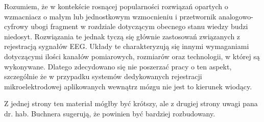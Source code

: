 
\begin{frame}[t]
    \begin{block}{\dk}
    \end{block}

    Rozumiem, że w kontekście rosnącej popularności rozwiązań opartych o wzmacniacz o małym lub jednostkowym wzmocnieniu i przetwornik analogowo-cyfrowy ubogi fragment w rozdziale dotyczącym obecnego stanu wiedzy budzi niedosyt.
    Rozwiązania te jednak tyczą  się głównie zastosowań związanych z rejestracją sygnałów EEG. Układy  te charakteryzują się innymi wymaganiami dotyczącymi ilości kanałów pomiarowych, rozmiarów oraz technologii, w której są wykonywane.
    Dlatego zdecydowano się nie poszerzać pracy o ten aspekt, szczególnie że w przypadku systemów dedykowanych rejestracji mikroelektrodowej aplikowanych wewnątrz mózgu nie jest to kierunek wiodący.

\end{frame}

\begin{frame}[t]
    \begin{block}{\dk}
    \end{block}
    Z jednej strony ten materiał mógłby być krótszy, ale z drugiej strony uwagi pana dr. hab. Buchnera sugerują, że powinien być bardziej rozbudowany.
\end{frame}

